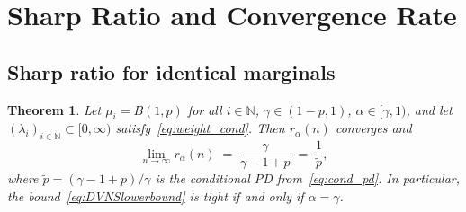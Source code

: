\documentclass[11pt]{article}
\newtheorem{theorem}{Theorem}[section]
\theoremstyle{definition}
\newcommand{\N}{\mathbb{N}}
\newcommand{\1}{\mathbf{1}}
\begin{document}
\section{Sharp Ratio and Convergence Rate}\label{sec:main}

\subsection{Sharp ratio for identical marginals}

\begin{theorem}\label{thm:sharp_identical}
Let $\mu_i = B(1,p)$ for all $i \in \N$, $\gamma \in (1-p, 1)$, $\alpha \in [\gamma, 1)$, and let $(\lambda_i)_{i \in \N} \subset [0, \infty)$ satisfy~\eqref{eq:weight_cond}. Then $r_\alpha(n)$ converges and
\begin{equation}\label{eq:sharp_identical}
  \lim_{n \to \infty} r_\alpha(n) \;=\; \frac{\gamma}{\gamma - 1 + p} \;=\; \frac{1}{\tilde{p}},
\end{equation}
where $\tilde{p} = (\gamma - 1 + p)/\gamma$ is the conditional PD from~\eqref{eq:cond_pd}. In particular, the bound~\eqref{eq:DVNSlowerbound} is tight if and only if $\alpha = \gamma$.
\end{theorem}
\end{document}

